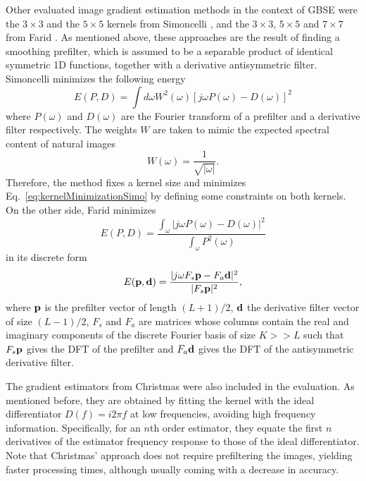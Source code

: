 Other evaluated image gradient estimation methods in the context of GBSE were the $3 \times 3$ and the $5 \times 5$ kernels from Simoncelli \cite{Simoncelli_1994}, and the $3 \times 3$, $5 \times 5$ and $7 \times 7$ from Farid \cite{farid2004differentiation}. As mentioned above, these approaches are the result of finding a smoothing prefilter, which is assumed to be a separable product of identical symmetric 1D functions, together with a derivative antisymmetric filter. Simoncelli minimizes the following energy
\begin{equation}
	E(P,D) = \int d\omega W^2(\omega)[j\omega P(\omega) - D(\omega)]^2
	\label{eq:kernelMinimizationSimo}
\end{equation}
where $P(\omega)$ and $D(\omega)$ are the Fourier transform of a prefilter and a derivative filter respectively. The weights $W$ are taken to mimic the expected spectral content of natural images 
\begin{equation}
	W(\omega) = \frac{1}{\sqrt{|\omega|}}.
\end{equation}
Therefore, the method fixes a kernel size and minimizes Eq.~\eqref{eq:kernelMinimizationSimo} by defining some constraints on both kernels. On the other side, Farid minimizes
\begin{equation}
	E(P,D) = \frac{\int_\omega|j\omega P(\omega) - D(\omega)|^2}{\int_\omega P^2(\omega)}
	\label{eq:gradientMinFarid}
\end{equation}
in its discrete form
\begin{equation}
	E(\mathbf{p},\mathbf{d}) = \frac{|j\omega F_s \mathbf{p} - F_a \mathbf{d}|^2}{|F_s \mathbf{p}|^2},
\end{equation}
where $\mathbf{p}$ is the prefilter vector of length $(L+1)/2$, $\mathbf{d}$ the derivative filter vector of size $(L-1)/2$, $F_s$ and $F_a$ are matrices whose columns contain the real and imaginary components of the discrete Fourier basis of size $K >> L$ such that $F_s \mathbf{p}$ gives the DFT of the prefilter and $F_a \mathbf{d}$ gives the DFT of the antisymmetric derivative filter.

The gradient estimators from Christmas \cite{christmas1998spatial} were also included in the evaluation. As mentioned before, they are obtained by fitting the kernel with the ideal differentiator $D(f) = i2\pi f$ at low frequencies, avoiding high frequency information. Specifically, for an $n$th order estimator, they equate the first $n$ derivatives of the estimator frequency response to those of the ideal differentiator. Note that Christmas' approach does not require prefiltering the images, yielding faster processing times, although usually coming with a decrease in accuracy.

